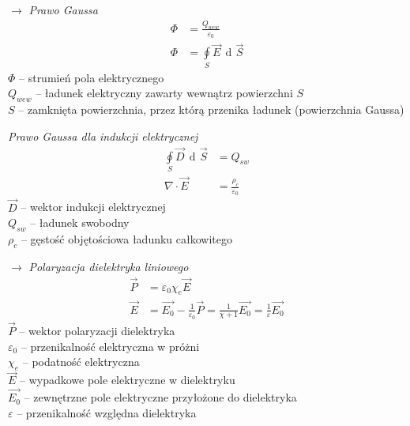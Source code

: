 \documentclass[12pt]{article}
\newenvironment{wzor}[1]{\par{\Large $\longrightarrow$ \textit{#1}}}
    {\newline {\color{grey} \rule{\linewidth}{0.3pt}}}
\DeclareMathOperator{\der}{\operatorname{d}\!}
\begin{document}
\begin{wzor}{Prawo Gaussa}
    \begin{align}
        \Phi &= \frac{Q_{wew}}{\varepsilon_0}\\
        \Phi &= \oint\limits_S \Vec{E} \, \der \Vec{S}
    \end{align}
    $\Phi$ -- strumień pola elektrycznego\\
    $Q_{wew}$ -- ładunek elektryczny zawarty wewnątrz powierzchni $S$\\
    $S$ -- zamknięta powierzchnia, przez którą przenika ładunek (powierzchnia Gaussa)
    \newpage
    \par {\textit{Prawo Gaussa dla indukcji elektrycznej}}
    \begin{align}
        \oint\limits_S \Vec{D} \, \der\Vec{S} &= Q_{sw} \\
        \nabla \cdot \Vec{E} &= \frac{\rho_c}{\varepsilon_0}
    \end{align}
    $\Vec{D}$ -- wektor indukcji elektrycznej\\
    $Q_{sw}$ -- ładunek swobodny\\
    $\rho_c$ -- gęstość objętościowa ładunku całkowitego
\end{wzor}

\begin{wzor}{Polaryzacja dielektryka liniowego}
    \begin{align}
        \Vec{P} &= \varepsilon_0 \chi_e \Vec{E}\\
        \Vec{E} &= \Vec{E_0} - \frac{1}{\varepsilon_0} \Vec{P}
                 = \frac{1}{\chi + 1} \Vec{E_0}
                 = \frac{1}{\varepsilon} \Vec{E_0}
    \end{align}
    $\Vec{P}$ -- wektor polaryzacji dielektryka\\
    $\varepsilon_0$ -- przenikalność elektryczna w próżni\\
    $\chi_e$ -- podatność elektryczna\\
    $\Vec{E}$ -- wypadkowe pole elektryczne w dielektryku\\
    $\Vec{E_0}$ -- zewnętrzne pole elektryczne przyłożone do dielektryka\\
    $\varepsilon$ -- przenikalność względna dielektryka
\end{wzor}
\end{document}
